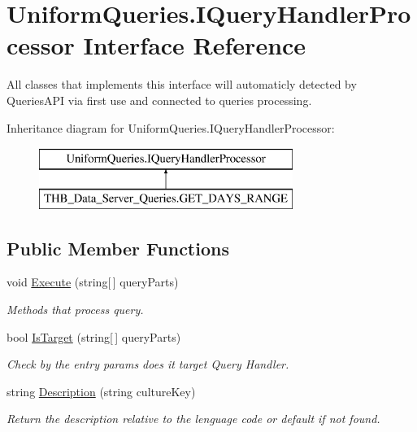 \hypertarget{interface_uniform_queries_1_1_i_query_handler_processor}{}\section{Uniform\+Queries.\+I\+Query\+Handler\+Processor Interface Reference}
\label{interface_uniform_queries_1_1_i_query_handler_processor}


All classes that implements this interface will automaticly detected by Queries\+A\+PI via first use and connected to queries processing.  


Inheritance diagram for Uniform\+Queries.\+I\+Query\+Handler\+Processor\+:\begin{figure}[H]
\begin{center}
\leavevmode
\includegraphics[height=2.000000cm]{d4/dc9/interface_uniform_queries_1_1_i_query_handler_processor}
\end{center}
\end{figure}
\subsection*{Public Member Functions}
\begin{DoxyCompactItemize}
\item 
void \mbox{\hyperlink{interface_uniform_queries_1_1_i_query_handler_processor_a60538b1b29c5d1d3bc67db28a265677a}{Execute}} (string\mbox{[}$\,$\mbox{]} query\+Parts)
\begin{DoxyCompactList}\small\item\em Methods that process query. \end{DoxyCompactList}\item 
bool \mbox{\hyperlink{interface_uniform_queries_1_1_i_query_handler_processor_a435493887db64defdb6019c3c418a4d4}{Is\+Target}} (string\mbox{[}$\,$\mbox{]} query\+Parts)
\begin{DoxyCompactList}\small\item\em Check by the entry params does it target Query Handler. \end{DoxyCompactList}\item 
string \mbox{\hyperlink{interface_uniform_queries_1_1_i_query_handler_processor_ae7323367177cd11c787d61029de5b044}{Description}} (string culture\+Key)
\begin{DoxyCompactList}\small\item\em Return the description relative to the lenguage code or default if not found. \end{DoxyCompactList}\end{DoxyCompactItemize}


